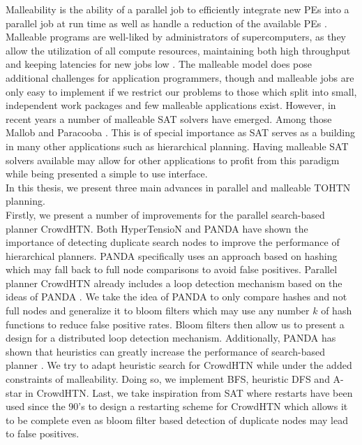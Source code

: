 \documentclass[enabledeprecatedfontcommands,12pt,a4paper,twoside]{scrartcl}
\numberwithin{equation}{section}
\begin{document}
Malleability is the ability of a parallel job to efficiently integrate new PEs into a parallel job at run time as well as handle a reduction of the available PEs \cite{feitelson1997job}. Malleable programs are well-liked by administrators of supercomputers, as they allow the utilization of all compute resources, maintaining both high throughput and keeping latencies for new jobs low \cite{feitelson1997job, hungershofer2004combined}. The malleable model does pose additional challenges for application programmers, though and malleable jobs are only easy to implement if we restrict our problems to those which split into small, independent work packages \cite{feitelson1997job, tucker1989process} and few malleable applications exist. 
However, in recent years a number of malleable SAT solvers have emerged. Among those Mallob \cite{sanders2022decentralized} and Paracooba \cite{heisinger2020distributed}. This is of special importance as SAT serves as a building in many other applications such as hierarchical planning. Having malleable SAT solvers available may allow for other applications to profit from this paradigm while being presented a simple to use interface. \\

In this thesis, we present three main advances in parallel and malleable TOHTN planning. \\
Firstly, we present a number of improvements for the parallel search-based planner CrowdHTN.
Both HyperTensioN \cite{magnaguagno2020hypertension} and PANDA \cite{holler2021loop} have shown the importance of detecting duplicate search nodes to improve the performance of hierarchical planners. PANDA specifically uses an approach based on hashing which may fall back to full node comparisons to avoid false positives. Parallel planner CrowdHTN already includes a loop detection mechanism based on the ideas of PANDA \cite{bretl2021parallel}. We take the idea of PANDA to only compare hashes and not full nodes and generalize it to bloom filters which may use any number $k$ of hash functions to reduce false positive rates. Bloom filters then allow us to present a design for a distributed loop detection mechanism. Additionally, PANDA has shown that heuristics can greatly increase the performance of search-based planner \cite{holler2020htn}. We try to adapt heuristic search for CrowdHTN while under the added constraints of malleability. Doing so, we implement BFS, heuristic DFS and A-star in CrowdHTN.
Last, we take inspiration from SAT where restarts have been used since the 90's \cite{crawford1994experimental} to design a restarting scheme for CrowdHTN which allows it to be complete even as bloom filter based detection of duplicate nodes may lead to false positives. \\
\end{document}
